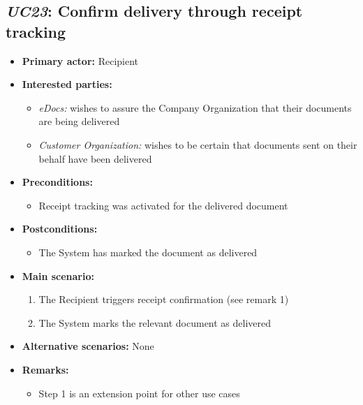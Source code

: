\documentclass[a4paper,10pt]{article}
\begin{document}
\subsection{\emph{UC23}: Confirm delivery through receipt tracking}
\begin{itemize}
	\item \textbf{Primary actor:} Recipient
	\item \textbf{Interested parties:} 
	\begin{itemize}
		\item \textit{eDocs:} wishes to assure the Company Organization that their documents are being delivered
		\item \textit{Customer Organization:} wishes to be certain that documents sent on their behalf have been delivered
	\end{itemize}
	
	\item \textbf{Preconditions:}
	\begin{itemize}
		\item Receipt tracking was activated for the delivered document
	\end{itemize}
	
	\item \textbf{Postconditions:}
	\begin{itemize}
		\item The System has marked the document as delivered
	\end{itemize}
	
	\item \textbf{Main scenario:} 
	\begin{enumerate}
		\item The Recipient triggers receipt confirmation (see remark 1)
		\item The System marks the relevant document as delivered
	\end{enumerate}
	
	\item \textbf{Alternative scenarios:} 
	None
	
	\item \textbf{Remarks:}
	\begin{itemize}
		\item Step 1 is an extension point for other use cases
	\end{itemize}
\end{itemize}
\end{document}
